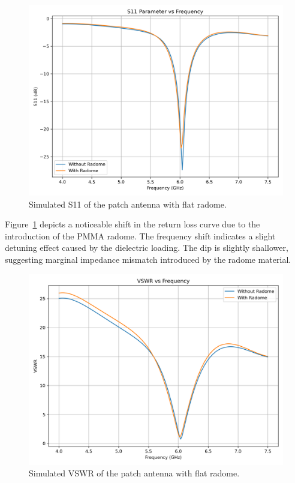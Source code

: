 \begin{figure}[H]
    \centering
    \includegraphics[width=1.0\textwidth]{figures/comparison_flat_radome/s11.png}
    \caption{Simulated S11 of the patch antenna with flat radome.}
    \label{fig:res-flat-s11}
\end{figure}

Figure~\ref{fig:res-flat-s11} depicts a noticeable shift in the return loss curve due to the introduction of the PMMA radome. The frequency shift indicates a slight detuning effect caused by the dielectric loading. The dip is slightly shallower, suggesting marginal impedance mismatch introduced by the radome material.

\begin{figure}[H]
    \centering
    \includegraphics[width=1.0\textwidth]{figures/comparison_flat_radome/vswr.png}
    \caption{Simulated VSWR of the patch antenna with flat radome.}
    \label{fig:res-flat-vswr}
\end{figure}


